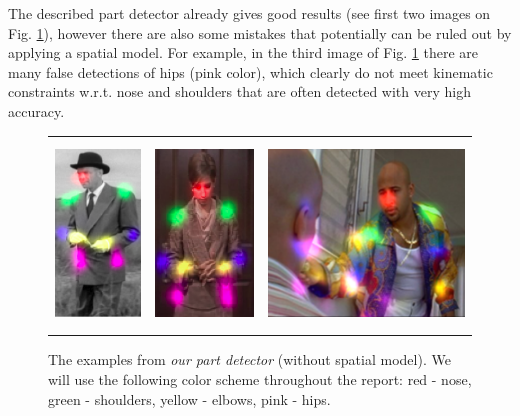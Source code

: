 \documentclass[a4paper,10pt]{article}
\begin{document}
	The described part detector already gives good results (see first two images on Fig. \ref{our_pd_examples}), however there are also some mistakes that potentially can be ruled out by applying a spatial model. For example, in the third image of Fig. \ref{our_pd_examples} there are many false detections of hips (pink color), which clearly do not meet kinematic constraints w.r.t. nose and shoulders that are often detected with very high accuracy.
	\begin{figure}[H]
		\begin{tabular}{ccc}
			\includegraphics[height=5cm]{img/ex1.png} & 
			\includegraphics[height=5cm]{img/ex2.png} &
			\includegraphics[height=5cm]{img/ex3.png} 
			\caption{The examples from \textit{our part detector} (without spatial model). We will use the following color scheme throughout the report: red - nose, green - shoulders, yellow - elbows, pink - hips. }
			\label{our_pd_examples}
		\end{tabular}
	\end{figure}
\end{document}
